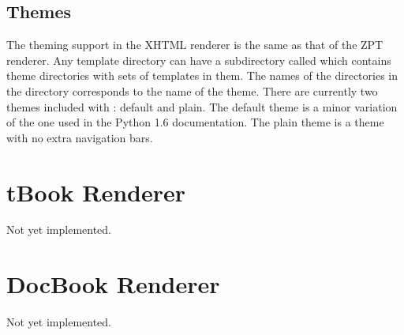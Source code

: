 \subsection{Themes}

The theming support in the XHTML renderer is the same as that of the
ZPT renderer.  Any template directory can have a subdirectory called
 which contains theme directories with sets of templates
in them.  The names of the directories in the  directory
corresponds to the name of the theme.  There are currently two themes
included with \plasTeX: default and plain.  The default theme is a
minor variation of the one used in the Python 1.6 documentation.  The
plain theme is a theme with no extra navigation bars. 


\section{tBook Renderer}

Not yet implemented.

\section{DocBook Renderer}

Not yet implemented.
